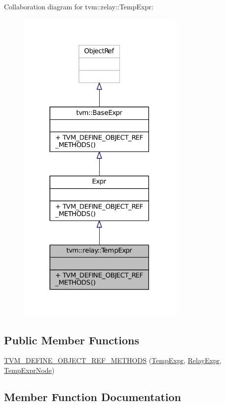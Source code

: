 Collaboration diagram for tvm\+:\+:relay\+:\+:Temp\+Expr\+:
\nopagebreak
\begin{figure}[H]
\begin{center}
\leavevmode
\includegraphics[width=230pt]{classtvm_1_1relay_1_1TempExpr__coll__graph}
\end{center}
\end{figure}
\subsection*{Public Member Functions}
\begin{DoxyCompactItemize}
\item 
\hyperlink{classtvm_1_1relay_1_1TempExpr_a0dff5db73df4c52fe58614d6b5cdd95a}{T\+V\+M\+\_\+\+D\+E\+F\+I\+N\+E\+\_\+\+O\+B\+J\+E\+C\+T\+\_\+\+R\+E\+F\+\_\+\+M\+E\+T\+H\+O\+DS} (\hyperlink{classtvm_1_1relay_1_1TempExpr}{Temp\+Expr}, \hyperlink{classtvm_1_1RelayExpr}{Relay\+Expr}, \hyperlink{classtvm_1_1relay_1_1TempExprNode}{Temp\+Expr\+Node})
\end{DoxyCompactItemize}


\subsection{Member Function Documentation}
